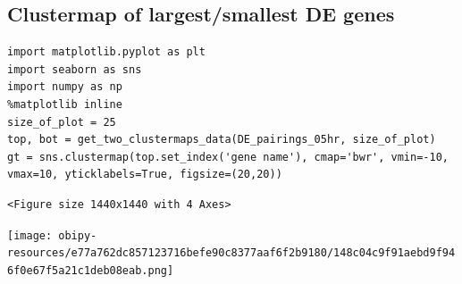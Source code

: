 \documentclass[11pt]{article}
\begin{document}
\subsection{Clustermap of largest/smallest DE genes}
\label{sec:org27a4dbd}
\begin{verbatim}
import matplotlib.pyplot as plt
import seaborn as sns
import numpy as np
%matplotlib inline
size_of_plot = 25
top, bot = get_two_clustermaps_data(DE_pairings_05hr, size_of_plot)
gt = sns.clustermap(top.set_index('gene name'), cmap='bwr', vmin=-10, vmax=10, yticklabels=True, figsize=(20,20))
\end{verbatim}

\begin{verbatim}
<Figure size 1440x1440 with 4 Axes>
\end{verbatim}


\begin{center}
\texttt{[image: obipy-resources/e77a762dc857123716befe90c8377aaf6f2b9180/148c04c9f91aebd9f946f0e67f5a21c1deb08eab.png]}
\end{center}
\end{document}
